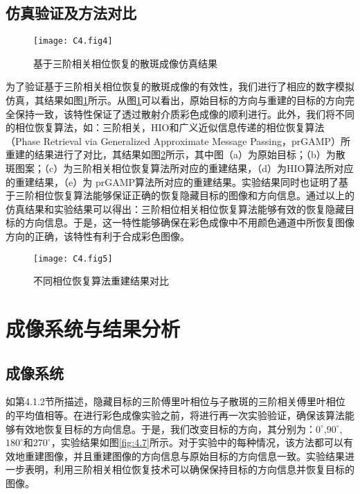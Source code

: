 \subsection{仿真验证及方法对比}

\begin{figure}[htp]
	\centering
	\texttt{[image: C4.fig4]}
	\caption{基于三阶相关相位恢复的散斑成像仿真结果}
	\label{fig:4.4}
\end{figure}

为了验证基于三阶相关相位恢复的散斑成像的有效性，我们进行了相应的数字模拟仿真，其结果如图\ref{fig:4.4}所示。从图\ref{fig:4.4}可以看出，原始目标的方向与重建的目标的方向完全保持一致，该特性保证了透过散射介质彩色成像的顺利进行。此外，我们将不同的相位恢复算法，如：三阶相关，HIO和广义近似信息传递的相位恢复算法（Phase Retrieval via Generalized Approximate Message Passing，prGAMP）所重建的结果进行了对比，其结果如图\ref{fig:4.5}所示，其中图（a）为原始目标；（b）为散斑图案；（c）为三阶相关相位恢复算法所对应的重建结果，（d）为HIO算法所对应的重建结果，（e）为 prGAMP算法所对应的重建结果。实验结果同时也证明了基于三阶相位恢复算法能够保证正确的恢复隐藏目标的图像和方向信息。通过以上的仿真结果和实验结果可以得出：三阶相位相关相位恢复算法能够有效的恢复隐藏目标的方向信息。于是，这一特性能够确保在彩色成像中不用颜色通道中所恢复图像方向的正确，该特性有利于合成彩色图像。

\begin{figure}[htp]
	\centering
	\texttt{[image: C4.fig5]}
	\caption{不同相位恢复算法重建结果对比}
	\label{fig:4.5}
\end{figure}

\section{成像系统与结果分析}
\subsection{成像系统}

如第4.1.2节所描述，隐藏目标的三阶傅里叶相位与子散斑的三阶相关傅里叶相位的平均值相等。在进行彩色成像实验之前，将进行再一次实验验证，确保该算法能够有效地恢复目标的方向信息。于是，我们改变目标的方向，其分别为：$0^{\circ}$,$90^{\circ}$,$180^{\circ}$和$270^{\circ}$，实验结果如图\ref{fig:4.7}所示。对于实验中的每种情况，该方法都可以有效地重建图像，并且重建图像的方向信息与原始目标的方向信息一致。实验结果进一步表明，利用三阶相关相位恢复技术可以确保保持目标的方向信息并恢复目标的图像。

